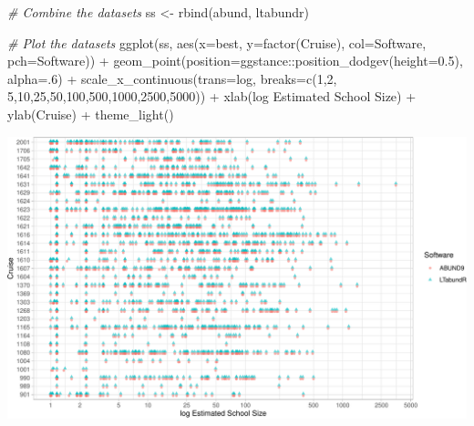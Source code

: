 \documentclass[
]{book}
\newenvironment{Shaded}{\begin{snugshade}}{\end{snugshade}}
\newcommand{\AttributeTok}[1]{\textcolor[rgb]{0.77,0.63,0.00}{#1}}
\newcommand{\CommentTok}[1]{\textcolor[rgb]{0.56,0.35,0.01}{\textit{#1}}}
\newcommand{\DecValTok}[1]{\textcolor[rgb]{0.00,0.00,0.81}{#1}}
\newcommand{\FloatTok}[1]{\textcolor[rgb]{0.00,0.00,0.81}{#1}}
\newcommand{\FunctionTok}[1]{\textcolor[rgb]{0.00,0.00,0.00}{#1}}
\newcommand{\NormalTok}[1]{#1}
\newcommand{\OtherTok}[1]{\textcolor[rgb]{0.56,0.35,0.01}{#1}}
\newcommand{\SpecialCharTok}[1]{\textcolor[rgb]{0.00,0.00,0.00}{#1}}
\newcommand{\StringTok}[1]{\textcolor[rgb]{0.31,0.60,0.02}{#1}}
\begin{document}
\begin{Shaded}
\begin{Highlighting}[]
\CommentTok{\# Combine the datasets}
\NormalTok{ss }\OtherTok{\textless{}{-}} \FunctionTok{rbind}\NormalTok{(abund, ltabundr)}

\CommentTok{\# Plot the datasets}
\FunctionTok{ggplot}\NormalTok{(ss,}
       \FunctionTok{aes}\NormalTok{(}\AttributeTok{x=}\NormalTok{best, }
           \AttributeTok{y=}\FunctionTok{factor}\NormalTok{(Cruise), }
           \AttributeTok{col=}\NormalTok{Software, }
           \AttributeTok{pch=}\NormalTok{Software)) }\SpecialCharTok{+} 
      \FunctionTok{geom\_point}\NormalTok{(}\AttributeTok{position=}\NormalTok{ggstance}\SpecialCharTok{::}\FunctionTok{position\_dodgev}\NormalTok{(}\AttributeTok{height=}\FloatTok{0.5}\NormalTok{),}
                 \AttributeTok{alpha=}\NormalTok{.}\DecValTok{6}\NormalTok{) }\SpecialCharTok{+}
      \FunctionTok{scale\_x\_continuous}\NormalTok{(}\AttributeTok{trans=}\StringTok{\textquotesingle{}log\textquotesingle{}}\NormalTok{, }\AttributeTok{breaks=}\FunctionTok{c}\NormalTok{(}\DecValTok{1}\NormalTok{,}\DecValTok{2}\NormalTok{, }\DecValTok{5}\NormalTok{,}\DecValTok{10}\NormalTok{,}\DecValTok{25}\NormalTok{,}\DecValTok{50}\NormalTok{,}\DecValTok{100}\NormalTok{,}\DecValTok{500}\NormalTok{,}\DecValTok{1000}\NormalTok{,}\DecValTok{2500}\NormalTok{,}\DecValTok{5000}\NormalTok{)) }\SpecialCharTok{+}
      \FunctionTok{xlab}\NormalTok{(}\StringTok{\textquotesingle{}log Estimated School Size\textquotesingle{}}\NormalTok{) }\SpecialCharTok{+}
      \FunctionTok{ylab}\NormalTok{(}\StringTok{\textquotesingle{}Cruise\textquotesingle{}}\NormalTok{) }\SpecialCharTok{+} 
  \FunctionTok{theme\_light}\NormalTok{()}
\end{Highlighting}
\end{Shaded}

\includegraphics{figures/unnamed-chunk-125-1.pdf}
\end{document}
